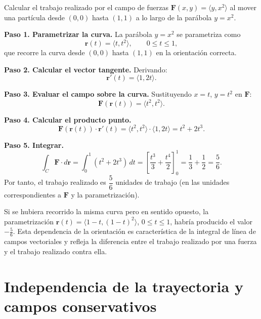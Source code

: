 \begin{example}
Calcular el trabajo realizado por el campo de fuerzas
$\mathbf{F}(x,y) = \langle y, x^2 \rangle$ al mover una partícula desde
$(0,0)$ hasta $(1,1)$ a lo largo de la parábola $y=x^2$.
\begin{myproof}
\textbf{Paso 1. Parametrizar la curva.}
La parábola $y=x^2$ se parametriza como
\[
\mathbf{r}(t) = \langle t, t^2 \rangle, \qquad 0 \le t \le 1,
\]
que recorre la curva desde $(0,0)$ hasta $(1,1)$ en la orientación
correcta.

\textbf{Paso 2. Calcular el vector tangente.}
Derivando:
\[
\mathbf{r}'(t) = \langle 1, 2t \rangle.
\]

\textbf{Paso 3. Evaluar el campo sobre la curva.}
Sustituyendo $x=t$, $y=t^2$ en $\mathbf{F}$:
\[
\mathbf{F}(\mathbf{r}(t)) = \langle t^2, t^2 \rangle.
\]

\textbf{Paso 4. Calcular el producto punto.}
\[
\mathbf{F}(\mathbf{r}(t)) \cdot \mathbf{r}'(t)
= \langle t^2, t^2 \rangle \cdot \langle 1, 2t \rangle
= t^2 + 2t^3.
\]

\textbf{Paso 5. Integrar.}
\[
\int_C \mathbf{F} \cdot d\mathbf{r}
= \int_0^1 (t^2 + 2t^3) \, dt
= \left[ \frac{t^3}{3} + \frac{t^4}{2} \right]_0^1
= \frac{1}{3} + \frac{1}{2} = \frac{5}{6}.
\]
Por tanto, el trabajo realizado es $\boxed{\dfrac{5}{6}}$ unidades de
trabajo (en las unidades correspondientes a $\mathbf{F}$ y la
parametrización).
\end{myproof}
\end{example}

\begin{rem}
Si se hubiera recorrido la misma curva pero en sentido opuesto, la
parametrización $\mathbf{r}(t)=\langle 1-t, (1-t)^2 \rangle$,
$0\le t\le 1$, habría producido el valor $-\frac{5}{6}$. Esta
dependencia de la orientación es característica de la integral de línea
de campos vectoriales y refleja la diferencia entre el trabajo realizado
por una fuerza y el trabajo realizado contra ella.
\end{rem}

\section{Independencia de la trayectoria y campos conservativos}

